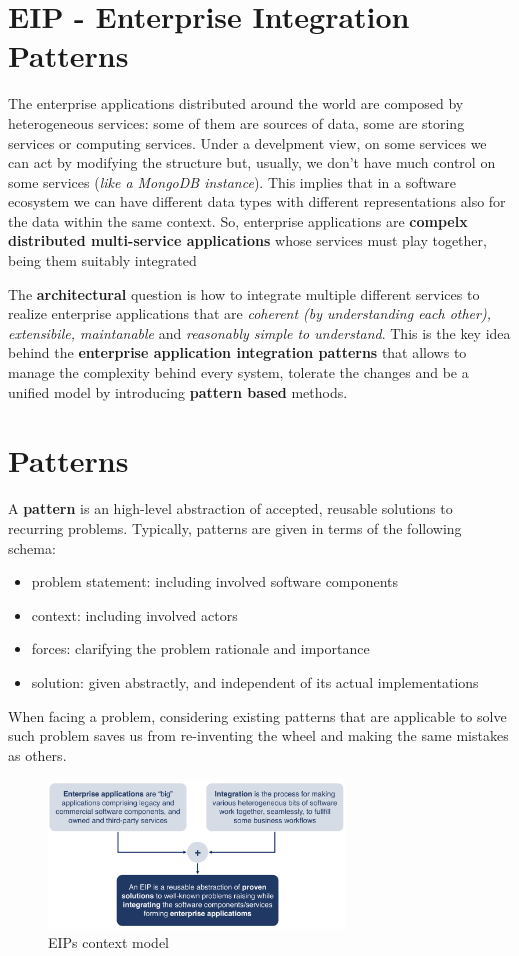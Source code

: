 \documentclass[10pt,a4paper]{report}
\begin{document}
\section{EIP - Enterprise Integration Patterns}
The enterprise applications distributed around the world are composed by heterogeneous services: some of them are sources of data, some are storing services or computing services. Under a develpment view, on some services we can act by modifying the structure but, usually, we don't have much control on some services (\textit{like a MongoDB instance}).  This implies that in a software ecosystem we can have different data types with different representations also for the data within the same context.
So, enterprise applications are \textbf{compelx distributed multi-service applications} whose services must play together, being them suitably integrated

The \textbf{architectural} question is how to integrate multiple different services to realize enterprise applications that are \textit{coherent (by understanding each other), extensibile, maintanable} and \textit{reasonably simple to understand}.
This is the key idea behind the \textbf{enterprise application integration patterns} that allows to manage the complexity behind every system, tolerate the changes and be a unified model by introducing \textbf{pattern based} methods.

\section{Patterns}
A \textbf{pattern} is an high-level abstraction of accepted, reusable solutions to recurring problems. Typically, patterns are given in terms of the following schema:
	\begin{itemize}
		\item problem statement: including involved software components
		\item context: including involved actors
		\item forces: clarifying the problem rationale and importance
		\item solution: given abstractly, and independent of its actual implementations
	\end{itemize}
When facing a problem, considering existing patterns that are applicable to solve such problem saves us from re-inventing the wheel and making the same mistakes as others.
 \begin{figure}[h]
	\centering
	\includegraphics[width=0.7\textwidth]{image33}
	\caption{EIPs context model}
	\label{image33}
\end{figure}
\end{document}
